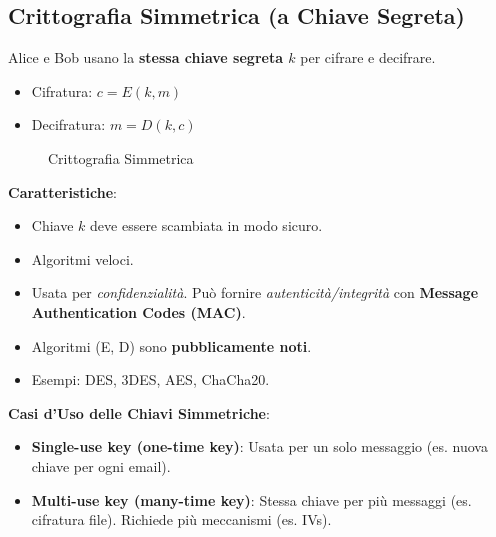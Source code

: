 \subsection{Crittografia Simmetrica (a Chiave Segreta)}
Alice e Bob usano la \textbf{stessa chiave segreta $k$} per cifrare e decifrare.
\begin{itemize}
    \item Cifratura: $c = E(k, m)$
    \item Decifratura: $m = D(k, c)$
\end{itemize}
\begin{figure}[H]
\centering
{}
\caption{Crittografia Simmetrica}
\label{fig:symmetric_crypto}
\end{figure}
\textbf{Caratteristiche}:
\begin{itemize}
    \item Chiave $k$ deve essere scambiata in modo sicuro.
    \item Algoritmi veloci.
    \item Usata per \textit{confidenzialità}. Può fornire \textit{autenticità/integrità} con \textbf{Message Authentication Codes (MAC)}.
    \item Algoritmi (E, D) sono \textbf{pubblicamente noti}.
    \item Esempi: DES, 3DES, AES, ChaCha20.
\end{itemize}
\textbf{Casi d'Uso delle Chiavi Simmetriche}:
\begin{itemize}
    \item \textbf{Single-use key (one-time key)}: Usata per un solo messaggio (es. nuova chiave per ogni email).
    \item \textbf{Multi-use key (many-time key)}: Stessa chiave per più messaggi (es. cifratura file). Richiede più meccanismi (es. IVs).
\end{itemize}


